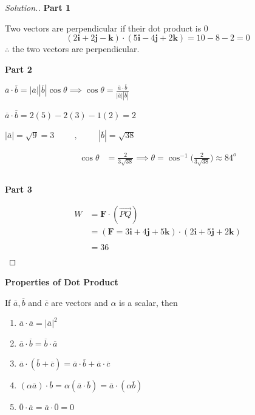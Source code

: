 \documentclass[11pt,a4paper]{article}
\theoremstyle{definition}
\newenvironment{solution}
  {\renewcommand{\qedsymbol}{}\begin{proof}[\textit{Solution}.]}
  {\end{proof}}
\newcommand{\subhead}[1]{%
  \par\medskip\noindent\textbf{#1}\par\nobreak\smallskip}
\begin{document}
\begin{solution}
\subhead{Part 1}
Two vectors are perpendicular if their dot product is 0 $$(2\textbf{i} + 2\textbf{j} -\textbf{k})\cdot ( 5\textbf{i} - 4\textbf{j} + 2\textbf{k}) = 10 - 8 - 2 = 0$$ 
$\therefore$ the two vectors are perpendicular.

\subhead{Part 2}
$\displaystyle{\overline{a}\cdot \overline{b} = \left|\overline{a}\right|\left|\overline{b}\right|\cos \theta \implies \cos \theta = \frac{\overline{a}\cdot\overline{b}}{
\left|\overline{a}\right|\left|\overline{b}\right|
}}$

$\displaystyle{\overline{a}\cdot\overline{b} = 2(5) - 2(3) -1(2) = 2}$

$\displaystyle{\left|\overline{a}\right| = \sqrt{9} = 3\hspace{1cm} , \hspace{1cm} \left|\overline{b}\right|= \sqrt{38}}$

\begin{align*}
\cos \theta & = \frac{2}{3\sqrt{38}}\implies \theta = \cos^{-1} \Big(\frac{2}{3\sqrt{38}}\Big) \approx 84^o\\\\
\end{align*}

\subhead{Part 3}
\begin{align*}
W & = \textbf{F}\cdot (\overrightarrow{PQ})\\
 & = (\textbf{F} = 3\textbf{i} + 4\textbf{j} + 5\textbf{k})\cdot ( 2\textbf{i} + 5\textbf{j} + 2\textbf{k})\\\\
 & = 36\\
\end{align*}
\end{solution}

\subhead{Properties of Dot Product}


If $\overline{a}, \overline{b}$ and $\overline{c}$ are vectors and $\alpha$ is a scalar, then 
\begin{enumerate}
\item $\overline{a}\cdot\overline{a} = \left|\overline{a}\right|^2$
\item $\overline{a}\cdot\overline{b} = \overline{b}\cdot\overline{a}$
\item $\overline{a}\cdot(\overline{b}+ \overline{c}) = \overline{a}\cdot \overline{b} + \overline{a}\cdot\overline{c}$
\item $(\alpha \overline{a})\cdot \overline{b} = \alpha (\overline{a}\cdot\overline{b}) = \overline{a}\cdot (\alpha \overline{b})$
\item $\overline{0}\cdot \overline{a} = \overline{a}\cdot \overline{0} = 0$
\end{enumerate}
\end{document}

